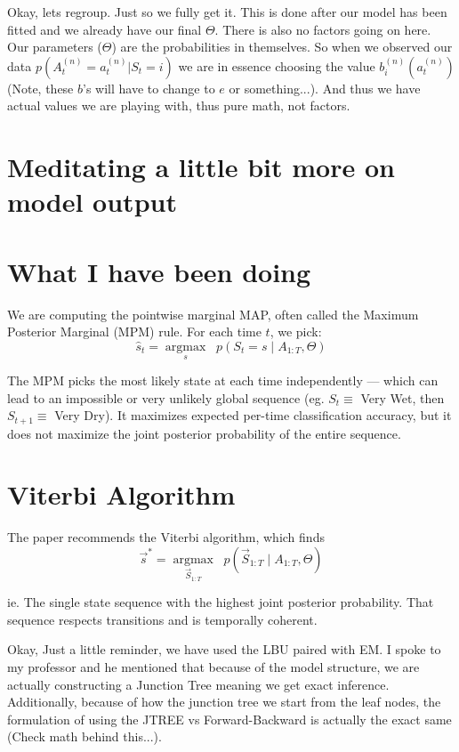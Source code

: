 Okay, lets regroup. Just so we fully get it. This is done after our model has been fitted and we already have our final $\Theta$. There is also no factors going on here. Our parameters ($\Theta$) are the probabilities in themselves. So when we observed our data $p(A_t^{(n)} = a_t^{(n)} | S_t = i)$ we are in essence choosing the value $b^{(n)}_i(a_t^{(n)})$ (Note, these $b$'s will have to change to $e$ or something...). And thus we have actual values we are playing with, thus pure math, not factors.



\section{Meditating a little bit more on model output}

\section{What I have been doing}

We are computing the pointwise marginal MAP, often called the Maximum Posterior Marginal (MPM) rule. For each time 
$t$, we pick: 
\[
    \hat{s}_t = \underset{s}{\operatorname{argmax}} \;\; p(S_t = s \mid A_{1:T}, \Theta)
\]

The MPM picks the most likely state at each time independently — which can lead to an impossible or very unlikely global sequence (eg. $S_t \equiv$ Very Wet, then $S_{t+1} \equiv$ Very Dry). It maximizes expected per-time classification accuracy, but it does not maximize the joint posterior probability of the entire sequence.

\section{Viterbi Algorithm}

The paper recommends the Viterbi algorithm, which finds
\[
    \vec{s}^* = \underset{\vec{S}_{1:T}}{\operatorname{argmax}} \;\; p(\vec{S}_{1:T}\mid A_{1:T}, \Theta)

\]

ie. The single state sequence with the highest joint posterior probability. That sequence respects transitions and is temporally coherent.




Okay, Just a little reminder, we have used the LBU paired with EM. I spoke to my professor and he mentioned that because of the model structure, we are actually constructing a Junction Tree meaning we get exact inference. Additionally, because of how the junction tree we start from the leaf nodes, the formulation of using the JTREE vs Forward-Backward is actually the exact same (Check math behind this...). 

